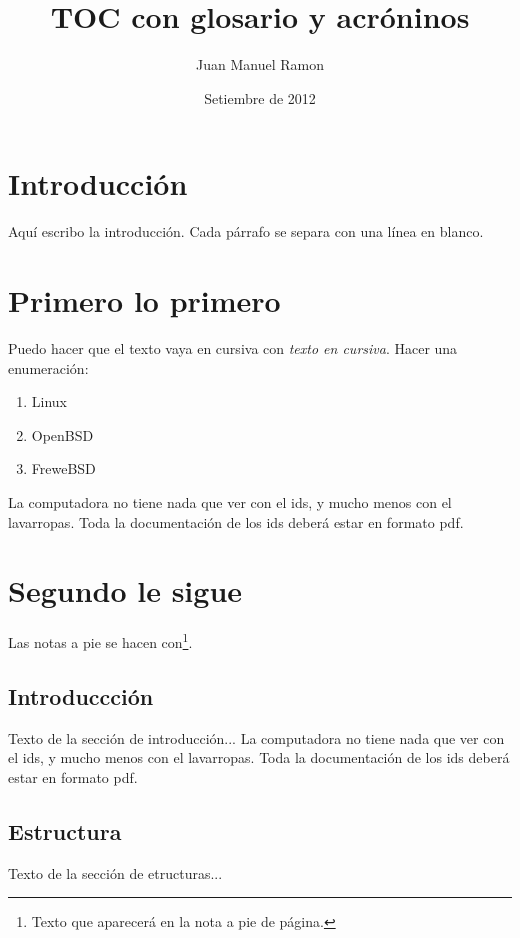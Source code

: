 \documentclass{book}
\begin{document}
\title{TOC con glosario y acróninos}
\author{Juan Manuel Ramon}
\date{Setiembre de 2012}
\maketitle

\frontmatter

\tableofcontents


\chapter{Introducción}
Aquí escribo la introducción. Cada párrafo se separa con una línea en blanco.
\mainmatter
 
\chapter{Primero lo primero}
Puedo hacer que el texto vaya en cursiva con \emph{texto en cursiva}. Hacer una enumeración:
\begin{enumerate}
\item Linux
\item OpenBSD
\item FreweBSD
\end{enumerate}

La \gls{computadora} no tiene nada que ver con el \gls{ids}, y mucho menos con el \gls{lavarropas}.
Toda la documentación de los \gls{ids} deberá estar en formato \gls{pdf}.

\chapter{Segundo le sigue}
Las notas a  pie se hacen con\footnote{Texto que aparecerá en la nota a pie de página.}.

\section{Introduccción}
Texto de la sección de introducción...
La \gls{computadora} no tiene nada que ver con el \gls{ids}, y mucho menos con el \gls{lavarropas}.
Toda la documentación de los \gls{ids} deberá estar en formato \gls{pdf}.

\section{Estructura}
Texto de la sección de etructuras...
\end{document}
